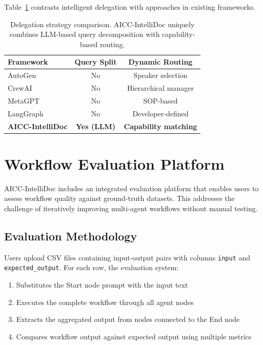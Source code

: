 \documentclass[11pt]{article}
\begin{document}
Table~\ref{tab:delegation-comparison} contrasts intelligent delegation with approaches in existing frameworks.

\begin{table}[t]
\centering
\small
\begin{tabular}{lcc}
\toprule
\textbf{Framework} & \textbf{Query Split} & \textbf{Dynamic Routing} \\
\midrule
AutoGen & No & Speaker selection \\
CrewAI & No & Hierarchical manager \\
MetaGPT & No & SOP-based \\
LangGraph & No & Developer-defined \\
\textbf{AICC-IntelliDoc} & \textbf{Yes (LLM)} & \textbf{Capability matching} \\
\bottomrule
\end{tabular}
\caption{Delegation strategy comparison. AICC-IntelliDoc uniquely combines LLM-based query decomposition with capability-based routing.}
\label{tab:delegation-comparison}
\end{table}


\section{Workflow Evaluation Platform}
\label{sec:evaluation}

AICC-IntelliDoc includes an integrated evaluation platform that enables users to assess workflow quality against ground-truth datasets. This addresses the challenge of iteratively improving multi-agent workflows without manual testing.

\subsection{Evaluation Methodology}

Users upload CSV files containing input-output pairs with columns \texttt{input} and \texttt{expected\_output}. For each row, the evaluation system:

\begin{enumerate}
    \item Substitutes the Start node prompt with the input text
    \item Executes the complete workflow through all agent nodes
    \item Extracts the aggregated output from nodes connected to the End node
    \item Compares workflow output against expected output using multiple metrics
\end{enumerate}
\end{document}
